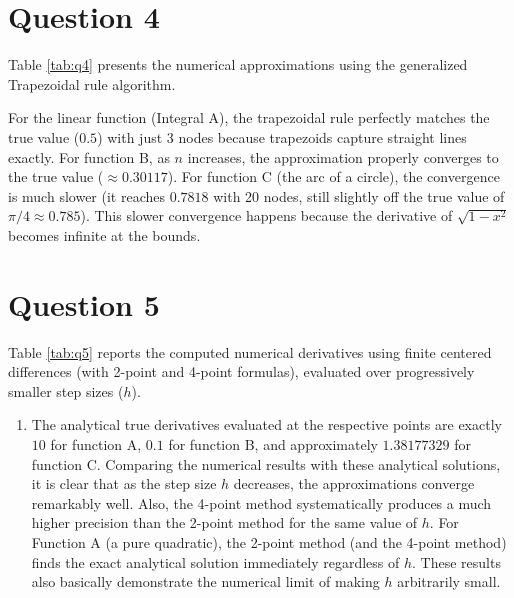 \documentclass[11pt]{article}
\numberwithin{equation}{section}
\numberwithin{figure}{section}
\begin{document}
\section*{Question 4}
Table \ref{tab:q4} presents the numerical approximations using the generalized Trapezoidal rule algorithm.
    \begin{table}[H] 
      \centering 
      \caption{Trapezoidal Rule Integration} 
      \label{tab:q4} 
      \resizebox{0.75\textwidth}{!}{%
        
      }
    \end{table} 
For the linear function (Integral A), the trapezoidal rule perfectly matches the true value ($0.5$) with just 3 nodes because trapezoids capture straight lines exactly. For function B, as $n$ increases, the approximation properly converges to the true value ($\approx 0.30117$). For function C (the arc of a circle), the convergence is much slower (it reaches $0.7818$ with 20 nodes, still slightly off the true value of $\pi/4 \approx 0.785$). This slower convergence happens because the derivative of $\sqrt{1-x^2}$ becomes infinite at the bounds.

\section*{Question 5}
Table \ref{tab:q5} reports the computed numerical derivatives using finite centered differences (with 2-point and 4-point formulas), evaluated over progressively smaller step sizes ($h$).
    \begin{table}[H] 
      \centering 
      \caption{Computed Numerical Derivatives via Finite Differences} 
      \label{tab:q5} 
      \resizebox{\textwidth}{!}{%
        
      }
    \end{table} 
\begin{enumerate}
    \item[d)] The analytical true derivatives evaluated at the respective points are exactly $10$ for function A, $0.1$ for function B, and approximately $1.38177329$ for function C.  Comparing the numerical results with these analytical solutions, it is clear that as the step size $h$ decreases, the approximations converge remarkably well. Also, the 4-point method systematically produces a much higher precision than the 2-point method for the same value of $h$. For Function A (a pure quadratic), the 2-point method (and the 4-point method) finds the exact analytical solution immediately regardless of $h$. These results also basically demonstrate the numerical limit of making $h$ arbitrarily small.
\end{enumerate}
\end{document}
